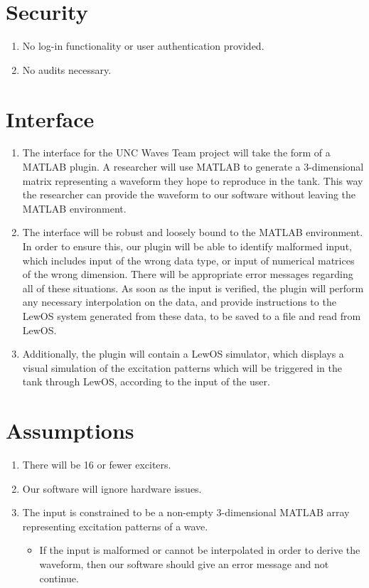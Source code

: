 \documentclass[12pt]{article}
\begin{document}
\section{Security}

\begin{enumerate}
\item No log-in functionality or user authentication provided.
\item No audits necessary.
\end{enumerate}

\section{Interface}

\begin{enumerate}
\item The interface for the UNC Waves Team project will take the form of a MATLAB plugin.  A researcher will use MATLAB to generate a 3-dimensional matrix representing a waveform they hope to reproduce in the tank.  This way the researcher can provide the waveform to our software without leaving the MATLAB environment. 
\item The interface will be robust and loosely bound to the MATLAB environment.  In order to ensure this, our plugin will be able to identify malformed input, which includes input of the wrong data type, or input of numerical matrices of the wrong dimension.  There will be appropriate error messages regarding all of these situations.  As soon as the input is verified, the plugin will perform any necessary interpolation on the data, and provide instructions to the LewOS system generated from these data, to be saved to a file and read from LewOS.
\item Additionally, the plugin will contain a LewOS simulator, which displays a visual simulation of the excitation patterns which will be triggered in the tank through LewOS, according to the input of the user.
\end{enumerate}

\section{Assumptions}

\begin{enumerate}
\item There will be 16 or fewer exciters.
\item Our software will ignore hardware issues.
\item The input is constrained to be a non-empty 3-dimensional MATLAB array representing excitation patterns of a wave.
	\begin{itemize}
	\item If the input is malformed or cannot be interpolated in order to derive the waveform, then our software should give an error message and not continue.
	\end{itemize}
\end{enumerate}
\end{document}
